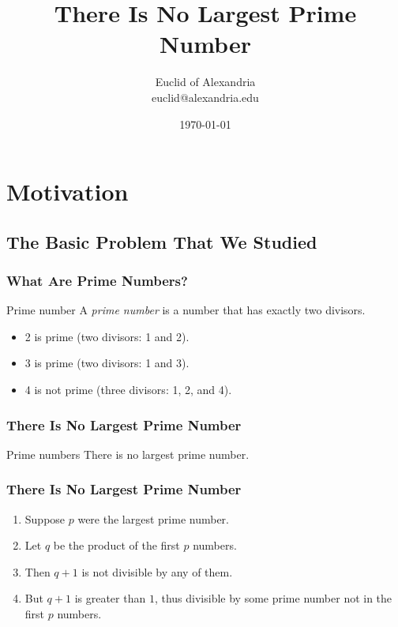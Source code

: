 \documentclass{beamer}
\title{There Is No Largest Prime Number}
\author[Euclid]{Euclid of Alexandria \\ euclid@alexandria.edu}
\date{\today}
\begin{document}
\frame{
\titlepage
}



\section{Motivation}
\subsection{The Basic Problem That We Studied}

\frame{
  \sectionpage
}


\begin{frame}[allowframebreaks]
  \frametitle{What Are Prime Numbers?}
  \begin{Definition}{Prime number}
    A \emph{prime number} is a number that has exactly two divisors.
  \end{Definition}
  \framebreak
  \begin{Example}
    \begin{itemize}
      \item 2 is prime (two divisors: 1 and 2).
      \item 3 is prime (two divisors: 1 and 3).
      \item 4 is not prime (\alert{three} divisors: 1, 2, and 4).
    \end{itemize}
  \end{Example}
\end{frame}

\begin{frame}[fragile]
  \frametitle{There Is No Largest Prime Number}%
  \begin{Theorem}{Prime numbers}
    There is no largest prime number.
  \end{Theorem}
\end{frame}

\begin{frame}[fragile]
  \frametitle{There Is No Largest Prime Number}%
  \begin{Proof}
    \begin{enumerate}
      \item<1-> Suppose $p$ were the largest prime number.
      \item<2-> Let $q$ be the product of the first $p$ numbers.
      \item<3-> Then $q + 1$ is not divisible by any of them.
      \item<4-> But $q + 1$ is greater than $1$, thus divisible by some prime number not in the first $p$ numbers.\qedhere
    \end{enumerate}
  \end{Proof}
\end{frame}
\end{document}
